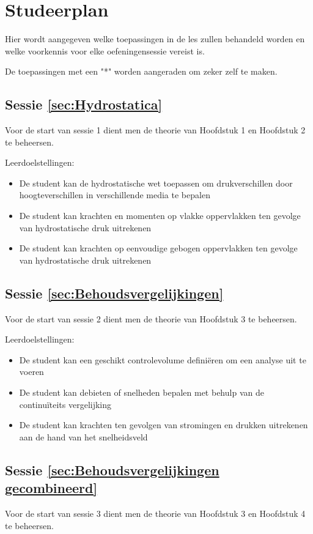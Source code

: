 \chapter{Studeerplan}
Hier wordt aangegeven welke toepassingen in de les zullen behandeld worden en welke voorkennis voor elke oefeningensessie vereist is.

De toepassingen met een "*" worden aangeraden om zeker zelf te maken.
	\section*{Sessie \ref{sec:Hydrostatica}}
Voor de start van sessie 1 dient men de theorie van Hoofdstuk 1 en Hoofdstuk 2 te beheersen.

Leerdoelstellingen:
\begin{itemize}
	\item De student kan de hydrostatische wet toepassen om drukverschillen door hoogteverschillen in verschillende media te bepalen
	\item De student kan krachten en momenten op vlakke oppervlakken ten gevolge van hydrostatische druk uitrekenen
	\item De student kan krachten op eenvoudige gebogen oppervlakken ten gevolge van hydrostatische druk uitrekenen
\end{itemize}
	
	\section*{Sessie \ref{sec:Behoudsvergelijkingen}}
Voor de start van sessie 2 dient men de theorie van Hoofdstuk 3 te beheersen.

Leerdoelstellingen:
\begin{itemize}
	\item De student kan een geschikt controlevolume definiëren om een analyse uit te voeren
	\item De student kan debieten of snelheden bepalen met behulp van de continuïteits vergelijking
	\item De student kan krachten ten gevolgen van stromingen en drukken uitrekenen aan de hand van het snelheidsveld
\end{itemize}

	\section*{Sessie \ref{sec:Behoudsvergelijkingen gecombineerd}}
Voor de start van sessie 3 dient men de theorie van Hoofdstuk 3 en Hoofdstuk 4 te beheersen.

